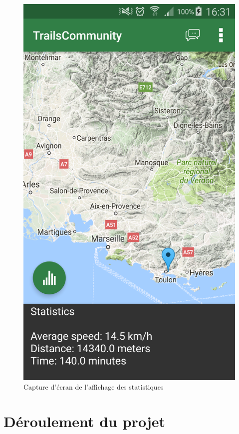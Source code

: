 \documentclass[titlepage, 12pt]{report}
\begin{document}
\begin{figure}[!h]
	\caption{Capture d'écran de l'affichage des statistiques}
	\label{screenshots_statistics}
	\centering
	\includegraphics[scale=0.2]{Images/screenshots/statistics.png}
\end{figure}

\clearpage


\part{Déroulement du projet}
\end{document}
